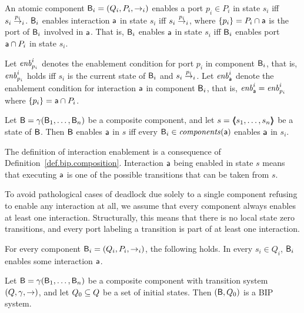 \begin{definition}\label{def.bip.enablement} 
An atomic component $\B_i = (Q_i,P_i,\goesto_i)$ enables a port $p_i \in P_i$ in state $s_i$ iff $s_i \goesto[p_i]_i$.
$\B_i$ enables interaction $\act$ in state $s_i$ iff $s_i \goesto[p_i]_i$, where $\set{p_i} = P_i \ints \act$ is the port of $\B_i$ involved in $\act$.
That is, $\B_i$ enables $\act$ in state $s_i$ iff $\B_i$ enables port $\act \ints P_i$ in state $s_i$. 

Let $\gd{p_i}{i}$ denotes the enablement condition for port $p_i$ in component $\B_i$, that is, $\gd{p_i}{i}$ holds iff
$s_i$ is the current state of $\B_i$ and $s_i \goesto[p_i]_i$.
Let $\gd{\act}{i}$ denote the enablement condition for interaction $\act$ in
component $\B_i$, that is,  $\gd{\act}{i} = \gd{p_i}{i}$ where $\set{p_i} = \act \ints P_i$.  

Let $\B = \gamma(\B_1,\dots,\B_n)$ be a composite component, and let $s =
\tpl{s_1,\ldots,s_n}$ be a state of $\B$.  Then $\B$ enables $\act$ in $s$
iff every $\B_i \in \cmps{\act}$ enables $\act$ in $s_i$.  
\end{definition}
%
The definition of  interaction enablement is a consequence of 
Definition~\ref{def.bip.composition}.
Interaction $\act$ being enabled in state $s$ means that executing
$\act$ is one of the possible transitions that can be taken from $s$.

To avoid pathological cases of deadlock due solely to a single component refusing to enable any interaction at all, 
we assume that every component always enables at least one interaction.
Structurally, this means that there is no local state zero transitions, and every port labeling a transition is 
part of at least one interaction. 

\begin{definition} \label{def.bip.local-enablement}
For every component  $\B_i = (Q_i,P_i,\goesto_i)$, the following holds. In every $s_i \in Q_i$, $\B_i$ enables some
interaction $\act$.
\end{definition}

\begin{definition}\label{def.bip.system} Let $\B = \gamma(\B_1,\dots,\B_n)$ be a composite component with transition system $(Q,\gamma,
\goestog)$, and let $Q_0 \sub Q$ be a set of initial states. Then
$(\B,Q_0)$ is a BIP system.  
\end{definition}

